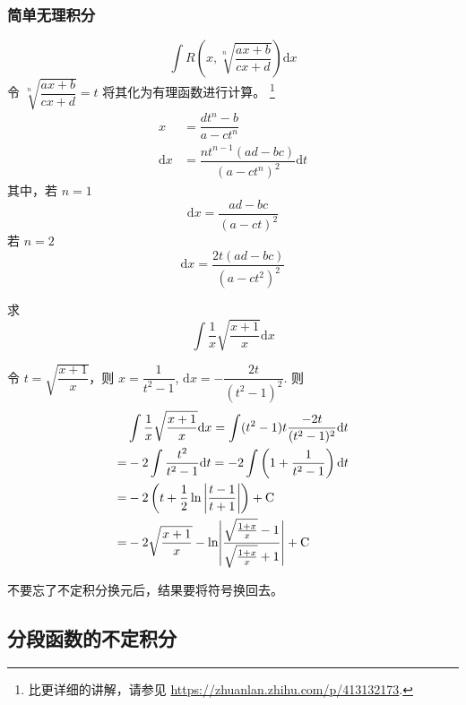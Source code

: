 \subsubsection{简单无理积分} \label{simple-irrational-integral}

\begin{equation}
    \int R\left(x, \sqrt[n]{\dfrac{ax+b}{cx+d}}\right) \mathrm{d} x
\end{equation}
令 $\sqrt[n]{\dfrac{ax+b}{cx+d}}=t$ 将其化为有理函数进行计算。
\footnote{
    比\cite{we}更详细的讲解，请参见
    \url{https://zhuanlan.zhihu.com/p/413132173}.
}
\begin{align*}
    x &= \dfrac{d t^n-b}{a-c t^n} \\
    \mathrm{d} x &= \dfrac{n t^{n-1} (a d-b c)}{\left(a-c t^n\right)^2} \mathrm{d} t
\end{align*}
其中，若 $n = 1$
\begin{equation}
    \mathrm{d} x = \dfrac{ad-bc}{(a-ct)^2}
\end{equation}
若 $n = 2$
\begin{equation}
    \mathrm{d} x = \dfrac{2t(ad-bc)}{(a-ct^2)^2}
\end{equation}

\begin{example}
    求
    \[
        \int \dfrac{1}{x} \sqrt{\dfrac{x+1}{x}} \mathrm{d} x
    \]

    令 $t =\sqrt{\dfrac{x+1}{x}}$，则 $x = \dfrac{1}{t^2 - 1}$,
    $\mathrm{d}x = - \dfrac{2t}{(t^2 - 1)^2}$.
    则
    \begin{align*}
          &\int \dfrac{1}{x} \sqrt{\dfrac{x+1}{x}} \mathrm{d} x 
        = \int (t^2 - 1) t \dfrac{-2t}{(t^2-1)^2} \mathrm{d} t \\
        = &-2 \int \dfrac{t^2}{t^2-1} \mathrm{d} t
        = -2 \int \left(1+\dfrac{1}{t^2-1}\right) \mathrm{d} t\\
        = &-2\left(t + \dfrac{1}{2} \ln \left|\dfrac{t-1}{t+1}\right|\right) + \mathrm{C} \\
        = &-2 \sqrt{\frac{x + 1}{x}} - \ln \abs*{\frac{\sqrt{\frac{1+x}{x} }-1}{\sqrt{\frac{1+x}{x} } +1}} + \mathrm C
    \end{align*}
\end{example}

不要忘了不定积分换元后，结果要将符号换回去。

\subsection{分段函数的不定积分}

